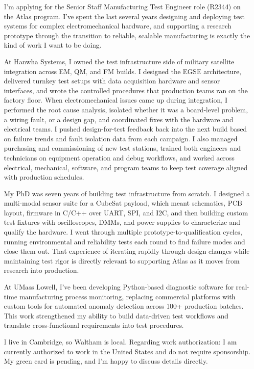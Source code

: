 \documentclass[letterpaper,11pt]{moderncv}
\date{\today}
\begin{document}
\makelettertitle

I'm applying for the Senior Staff Manufacturing Test Engineer role (R2344) on the Atlas program. I've spent the last several years designing and deploying test systems for complex electromechanical hardware, and supporting a research prototype through the transition to reliable, scalable manufacturing is exactly the kind of work I want to be doing.

At Hanwha Systems, I owned the test infrastructure side of military satellite integration across EM, QM, and FM builds. I designed the EGSE architecture, delivered turnkey test setups with data acquisition hardware and sensor interfaces, and wrote the controlled procedures that production teams ran on the factory floor. When electromechanical issues came up during integration, I performed the root cause analysis, isolated whether it was a board-level problem, a wiring fault, or a design gap, and coordinated fixes with the hardware and electrical teams. I pushed design-for-test feedback back into the next build based on failure trends and fault isolation data from each campaign. I also managed purchasing and commissioning of new test stations, trained both engineers and technicians on equipment operation and debug workflows, and worked across electrical, mechanical, software, and program teams to keep test coverage aligned with production schedules.

My PhD was seven years of building test infrastructure from scratch. I designed a multi-modal sensor suite for a CubeSat payload, which meant schematics, PCB layout, firmware in C/C++ over UART, SPI, and I2C, and then building custom test fixtures with oscilloscopes, DMMs, and power supplies to characterize and qualify the hardware. I went through multiple prototype-to-qualification cycles, running environmental and reliability tests each round to find failure modes and close them out. That experience of iterating rapidly through design changes while maintaining test rigor is directly relevant to supporting Atlas as it moves from research into production.

At UMass Lowell, I've been developing Python-based diagnostic software for real-time manufacturing process monitoring, replacing commercial platforms with custom tools for automated anomaly detection across 100+ production batches. This work strengthened my ability to build data-driven test workflows and translate cross-functional requirements into test procedures.

I live in Cambridge, so Waltham is local. Regarding work authorization: I am currently authorized to work in the United States and do not require sponsorship. My green card is pending, and I'm happy to discuss details directly.

\makeletterclosing
\end{document}
